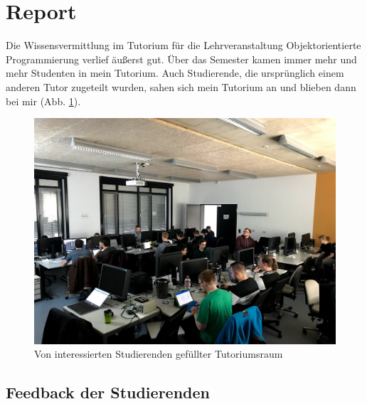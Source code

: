 



\usepackage{chngcntr}


 

%
 

\thispagestyle{plain}
\pagestyle{plain}

\tableofcontents

\listoffigures
 

\section{Report}

Die Wissensvermittlung im Tutorium für die Lehrveranstaltung Objektorientierte Programmierung verlief äußerst gut. Über das Semester kamen immer mehr und mehr Studenten in mein Tutorium. Auch Studierende, die ursprünglich einem anderen Tutor zugeteilt wurden, sahen sich mein Tutorium an und blieben dann bei mir (Abb. \ref{fig:Tutoriumsraum}).

\begin{figure}[htbp]
	\centering
		\includegraphics[width=1.00\textwidth]{img/Tutorium.jpg}
	\caption[Von interessierten Studierenden gefüllter Tutoriumsraum]{Von interessierten Studierenden gefüllter Tutoriumsraum}
	\label{fig:Tutoriumsraum}
\end{figure}

\subsection{Feedback der Studierenden}

